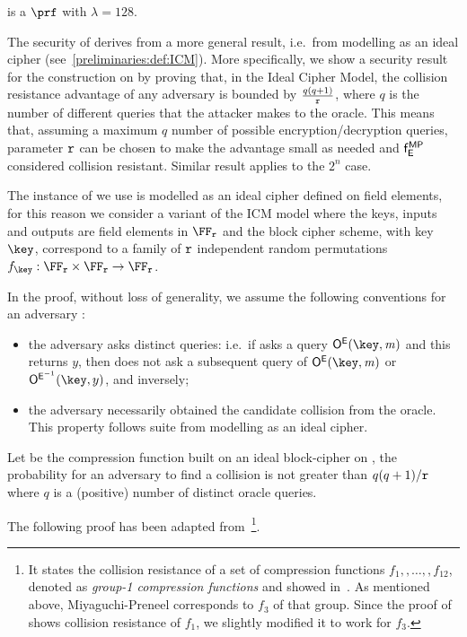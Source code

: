 \begin{lemma}
	 is a $\prf$ with $\lambda=128$.
\end{lemma}

The security of \mimcMPPrime{} derives from a more general result, i.e.~from modelling \mimcPrime{} as an ideal cipher (see~\cref{preliminaries:def:ICM}). More specifically, we show a security result for the \MP{} construction on \FFx{\rCURVE} by proving that, in the Ideal Cipher Model, the collision resistance advantage of any adversary is bounded by $\frac{q(q+1)}{\mathtt{r}}$, where $q$ is the number of different queries that the attacker makes to the oracle. This means that, assuming a maximum $q$ number of possible encryption/decryption queries, parameter $\mathtt{r}$ can be chosen to make the advantage small as needed and $\mathsf{f}_{\mathsf{E}}^{\mathsf{MP}}$ considered collision resistant. Similar result applies to the ${2^n}$ case.

The instance of \mimc{} we use is modelled as an ideal cipher defined on field elements, for this reason we consider a variant of the ICM model where the keys, inputs and outputs are field elements in $\FFx{\rCURVE}$ and the block cipher scheme, with key $\key$, correspond to a family of $\mathtt{r}$ independent random permutations $f_{\key}: \FFx{\rCURVE} \times \FFx{\rCURVE} \to \FFx{\rCURVE}$.

In the proof, without loss of generality, we assume the following conventions for an adversary \adv{}:
\begin{itemize}
    \item the adversary asks distinct queries: i.e.~if \adv{} asks a query $\oracleEnc(\key,\msg)$ and this returns $y$, then \adv{} does not ask a subsequent query of $\oracleEnc(\key,\msg)$ or $\oracleDec(\key,y)$, and inversely;
    \item the adversary necessarily obtained the candidate collision from the oracle. This property follows suite from modelling \mimc{} as an ideal cipher.
\end{itemize}

\begin{lemma}\label{lemma:colrescomp}
    Let \fMP{} be the \MP{} compression function built on an ideal block-cipher \Enc{} on \FFx{\rCURVE}, the probability for an adversary \adv{} to find a collision is not greater than $q(q+1)/\mathtt{r}$ where $q$ is a (positive) number of distinct oracle queries.
\end{lemma}

The following proof has been adapted from~\cite[Lemma 3.3]{black2002black}\footnote{It states the collision resistance of a set of compression functions $f_1,,\ldots,,f_{12}$, denoted as \emph{group-1 compression functions} and showed in~\cite[Figure 3]{black2002black}. As mentioned above, Miyaguchi-Preneel corresponds to $f_3$ of that group. Since the proof of~\cite[Lemma 3.3]{black2002black} shows collision resistance of $f_1$, we slightly modified it to work for $f_3$.}.

